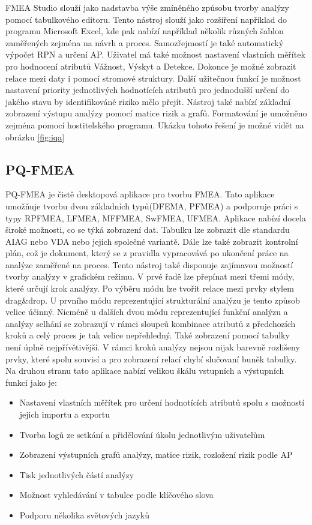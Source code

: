  FMEA Studio slouží jako nadstavba výše zmíněného způsobu tvorby analýzy pomocí tabulkového editoru. \cite{fmeaStudio} Tento nástroj slouží jako rozšíření například do programu Microsoft Excel, kde pak nabízí například několik různých šablon zaměřených zejména na návrh a proces. Samozřejmostí je také automatický výpočet RPN a určení AP. Uživatel má také možnost nastavení vlastních měřítek pro hodnocení atributů Vážnost, Výskyt a Detekce. Dokonce je možné zobrazit relace mezi daty i pomocí stromové struktury. Další užitečnou funkcí je možnost nastavení priority jednotlivých hodnotících atributů pro jednodušší určení do jakého stavu by identifikováné riziko mělo přejít. Nástroj také nabízí základní zobrazení výstupu analýzy pomocí matice rizik a grafů. Formatování je umožněno zejména pomocí hostitelského programu. Ukázku tohoto řešení je možné vidět na obrázku \ref{fig:iqa}
\break
\break


\subsection{PQ-FMEA}
 PQ-FMEA je čistě desktopová aplikace pro tvorbu FMEA. \cite{pqFMEA} Tato aplikace umožňuje tvorbu dvou základních typů(DFEMA, PFMEA) a podporuje práci s typy RPFMEA, LFMEA, MFFMEA, SwFMEA, UFMEA. Aplikace nabízí docela široké možnosti, co se týká zobrazení dat. Tabulku lze zobrazit dle standardu AIAG nebo VDA nebo jejich společné variantě. Dále lze také zobrazit kontrolní plán, což je dokument, který se z pravidla vypracovává po ukončení práce na analýze zaměřené na proces. Tento nástroj také disponuje zajímavou možností tvorby analýzy v grafickém režimu. V prvé řadě lze přepínat mezi třemi módy, které určují krok analýzy. Po výběru módu lze tvořit relace mezi prvky stylem drag\&drop. U prvního módu reprezentující strukturální analýzu je tento způsob velice účinný. Nicméně u dalších dvou módu reprezentující funkční analýzu a analýzy selhání se zobrazují v rámci sloupců kombinace atributů z předchozích kroků a celý proces je tak velice nepřehledný. Také zobrazení pomocí tabulky není úplně nejpřívětivější. V rámci kroků analýzy nejsou nijak barevně rozlišeny prvky, které spolu souvisí a pro zobrazení relací chybí slučovaní buněk tabulky. Na druhou stranu tato aplikace nabízí velikou škálu vstupních a výstupních funkcí jako je:
\begin{itemize}
    \item Nastavení vlastních měřítek pro určení hodnotících atributů spolu s možností jejich importu a exportu
    \item Tvorba logů ze setkání a přidělování úkolu jednotlivým uživatelům
    \item Zobrazení výstupních grafů analýzy, matice rizik, rozložení rizik podle AP 
    \item Tisk jednotlivých částí analýzy
    \item Možnost vyhledávání v tabulce podle klíčového slova
    \item Podporu několika světových jazyků
\end{itemize}

